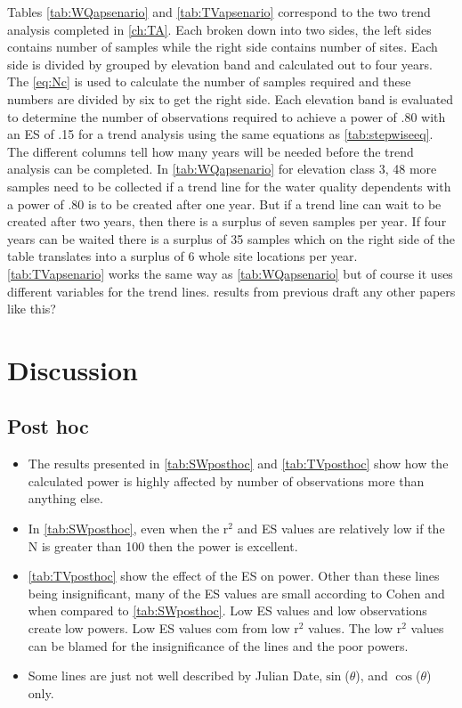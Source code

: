 
Tables \autoref{tab:WQapsenario} and \autoref{tab:TVapsenario} correspond to the two trend analysis completed in \autoref{ch:TA}.
Each broken down into two sides, the left sides contains number of samples while the right side contains number of sites.
Each side is divided by grouped by elevation band and calculated out to four years.
The \autoref{eq:Nc} is used to calculate the number of samples required and these numbers are divided by six to get the right side.
Each elevation band is evaluated to determine the number of observations required to achieve a power of .80 with an ES of .15 for a trend analysis using the same equations as \autoref{tab:stepwiseeq}.
The different columns tell how many years will be needed before the trend analysis can be completed.
In \autoref{tab:WQapsenario} for elevation class 3, 48 more samples need to be collected if a trend line for the water quality dependents with a power of .80 is to be created after one year.  
But if a trend line can wait to be created after two years, then there is a surplus of seven samples per year.  
If four years can be waited there is a surplus of 35 samples which on the right side of the table translates into a surplus of 6 whole site locations per year.
\autoref{tab:TVapsenario} works the same way as \autoref{tab:WQapsenario} but of course it uses different variables for the trend lines.
results from previous draft
any other papers like this?

\section{Discussion}

\subsection{Post hoc}
\begin{itemize}
	\item The results presented in \autoref{tab:SWposthoc} and \autoref{tab:TVposthoc} show how the calculated power is highly affected by number of observations more than anything else.
	\item In \autoref{tab:SWposthoc}, even when the r$^2$ and ES values are relatively low if the N is greater than 100 then the power is excellent.
	\item \autoref{tab:TVposthoc} show the effect of the ES on power.  Other than these lines being insignificant, many of the ES values are small according to Cohen and when compared to \autoref{tab:SWposthoc}.  Low ES values and low observations create low powers.  Low ES values com from low r$^2$ values.  The low r$^2$ values can be blamed for the insignificance of the lines and the poor powers. 
	\item Some lines are just not well described by Julian Date,$\sin$($\theta$), and $\cos$($\theta$) only.
\end{itemize}

